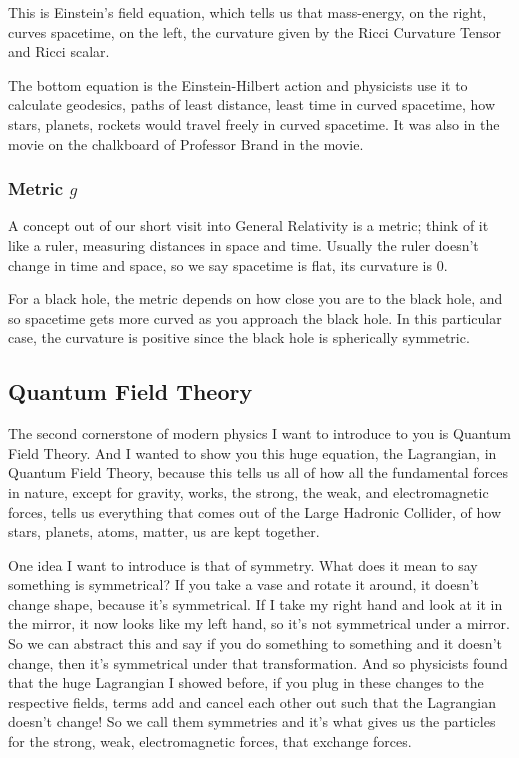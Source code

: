 \documentclass[10pt]{amsart}
\begin{document}
This is Einstein's field equation, which tells us that mass-energy, on the right, curves spacetime, on the left, the curvature given by the Ricci Curvature Tensor and Ricci scalar.

The bottom equation is the Einstein-Hilbert action and physicists use it to calculate geodesics, paths of least distance, least time in curved spacetime, how stars, planets, rockets would travel freely in curved spacetime. It was also in the movie on the chalkboard of Professor Brand in the movie.

\subsubsection{Metric $g$}

A concept out of our short visit into General Relativity is a metric; think of it like a ruler, measuring distances in space and time. Usually the ruler doesn't change in time and space, so we say spacetime is flat, its curvature is 0.

For a black hole, the metric depends on how close you are to the black hole, and so spacetime gets more curved as you approach the black hole. In this particular case, the curvature is positive since the black hole is spherically symmetric.

\subsection{Quantum Field Theory}

The second cornerstone of modern physics I want to introduce to you is Quantum Field Theory. And I wanted to show you this huge equation, the Lagrangian, in Quantum Field Theory, because this tells us all of how all the fundamental forces in nature, except for gravity, works, the strong, the weak, and electromagnetic forces, tells us everything that comes out of the Large Hadronic Collider, of how stars, planets, atoms, matter, us are kept together.

One idea I want to introduce is that of symmetry. What does it mean to say something is symmetrical? If you take a vase and rotate it around, it doesn't change shape, because it's symmetrical. If I take my right hand and look at it in the mirror, it now looks like my left hand, so it's not symmetrical under a mirror. So we can abstract this and say if you do something to something and it doesn't change, then it's symmetrical under that transformation. And so physicists found that the huge Lagrangian I showed before, if you plug in these changes to the respective fields, terms add and cancel each other out such that the Lagrangian doesn't change! So we call them symmetries and it's what gives us the particles for the strong, weak, electromagnetic forces, that exchange forces.
\end{document}
